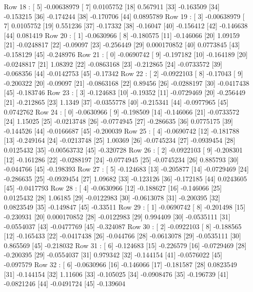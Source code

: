Row 18 : [ 5]  -0.00638979  [ 7]  0.0105752  [18]  0.567911  [33]  -0.163509  [34]  -0.153215  [36]  -0.174244  [38]  -0.170706  [44]  0.0895789  
Row 19 : [ 3]  -0.00638979  [ 7]  0.0105752  [19]  0.551236  [37]  -0.17332  [38]  -0.16047  [40]  -0.156412  [42]  -0.146638  [44]  0.081419  
Row 20 : [ 1]  -0.0630966  [ 8]  -0.180575  [11]  -0.146066  [20]  1.09159  [21]  -0.0248817  [22]  -0.09097  [23]  -0.256449  [29]  0.000170852  [40]  0.0773845  [43]  -0.158129  [45]  -0.248976  
Row 21 : [ 0]  -0.0690742  [ 9]  -0.197182  [10]  -0.164189  [20]  -0.0248817  [21]  1.08392  [22]  -0.0863168  [23]  -0.212865  [24]  -0.0733572  [39]  -0.068356  [44]  -0.0142753  [45]  -0.17342  
Row 22 : [ 2]  -0.0922103  [ 8]  -0.17043  [ 9]  -0.200322  [20]  -0.09097  [21]  -0.0863168  [22]  0.89456  [26]  -0.0288197  [30]  -0.0417438  [45]  -0.183746  
Row 23 : [ 3]  -0.124683  [10]  -0.19352  [11]  -0.0729469  [20]  -0.256449  [21]  -0.212865  [23]  1.1349  [37]  -0.0355778  [40]  -0.215341  [44]  -0.0977965  [45]  0.0742762  
Row 24 : [ 0]  -0.0630966  [ 9]  -0.198509  [14]  -0.146066  [21]  -0.0733572  [24]  1.15025  [25]  -0.0213748  [26]  -0.0774945  [27]  -0.286635  [36]  0.0775175  [39]  -0.144526  [44]  -0.0166687  [45]  -0.200039  
Row 25 : [ 4]  -0.0690742  [12]  -0.181788  [13]  -0.249164  [24]  -0.0213748  [25]  1.00369  [26]  -0.0745234  [27]  -0.0939454  [28]  0.0125432  [35]  -0.00563732  [45]  -0.320728  
Row 26 : [ 2]  -0.0922103  [ 9]  -0.208301  [12]  -0.161286  [22]  -0.0288197  [24]  -0.0774945  [25]  -0.0745234  [26]  0.885793  [30]  -0.044766  [45]  -0.198393  
Row 27 : [ 5]  -0.124683  [13]  -0.205877  [14]  -0.0729469  [24]  -0.286635  [25]  -0.0939454  [27]  1.09682  [33]  -0.123126  [36]  -0.172185  [44]  0.0243605  [45]  -0.0417793  
Row 28 : [ 4]  -0.0630966  [12]  -0.188627  [16]  -0.146066  [25]  0.0125432  [28]  1.06185  [29]  -0.0122983  [30]  -0.0613078  [31]  -0.200395  [32]  0.0823549  [35]  -0.149847  [45]  -0.33511  
Row 29 : [ 1]  -0.0690742  [ 8]  -0.201498  [15]  -0.230931  [20]  0.000170852  [28]  -0.0122983  [29]  0.994409  [30]  -0.0535111  [31]  -0.0554037  [43]  -0.0477769  [45]  -0.324087  
Row 30 : [ 2]  -0.0922103  [ 8]  -0.188565  [12]  -0.165433  [22]  -0.0417438  [26]  -0.044766  [28]  -0.0613078  [29]  -0.0535111  [30]  0.865569  [45]  -0.218032  
Row 31 : [ 6]  -0.124683  [15]  -0.226579  [16]  -0.0729469  [28]  -0.200395  [29]  -0.0554037  [31]  0.979342  [32]  -0.144154  [41]  -0.0576022  [45]  -0.097579  
Row 32 : [ 6]  -0.0630966  [16]  -0.146066  [17]  -0.181587  [28]  0.0823549  [31]  -0.144154  [32]  1.11606  [33]  -0.105025  [34]  -0.0908476  [35]  -0.196739  [41]  -0.0821246  [44]  -0.0491724  [45]  -0.139604  
